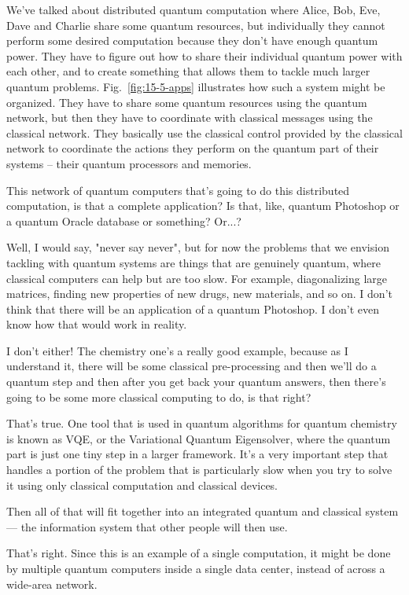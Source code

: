 \mmm We've talked about distributed quantum computation where Alice, Bob, Eve, Dave and Charlie share some quantum resources, but individually they cannot perform some desired computation because they don't have enough quantum power. They have to figure out how to share their individual quantum power with each other, and to create something that allows them to tackle much larger quantum problems. Fig.~\ref{fig:15-5-apps} illustrates how such a system might be organized. They have to share some quantum resources using the quantum network, but then they have to coordinate with classical messages using the classical network. They basically use the classical control provided by the classical network to coordinate the actions they perform on the quantum part of their systems -- their quantum processors and memories.

\rrr This network of quantum computers that's going to do this distributed computation, is that a complete application? Is that, like, quantum Photoshop or a quantum Oracle database or something? Or...?

\mmm Well, I would say, "never say never", but for now the problems that we envision tackling with quantum systems are things that are genuinely quantum, where classical computers can help but are too slow. For example, diagonalizing large matrices, finding new properties of new drugs, new materials, and so on. I don't think that there will be an application of a quantum Photoshop. I don't even know how that would work in reality.

\rrr I don't either! The chemistry one's a really good example, because as I understand it, there will be some classical pre-processing and then we'll do a quantum step and then after you get back your quantum answers, then there's going to be some more classical computing to do, is that right?

\mmm That's true. One tool that is used in quantum algorithms for quantum chemistry is known as VQE, or the Variational Quantum Eigensolver, where the quantum part is just one tiny step in a larger framework. It's a very important step that handles a portion of the problem that is particularly slow when you try to solve it using only classical computation and classical devices.

\rrr Then all of that will fit together into an integrated quantum and classical system --- the information system that other people will then use.

\mmm That's right. Since this is an example of a single computation, it might be done by multiple quantum computers inside a single data center, instead of across a wide-area network.

